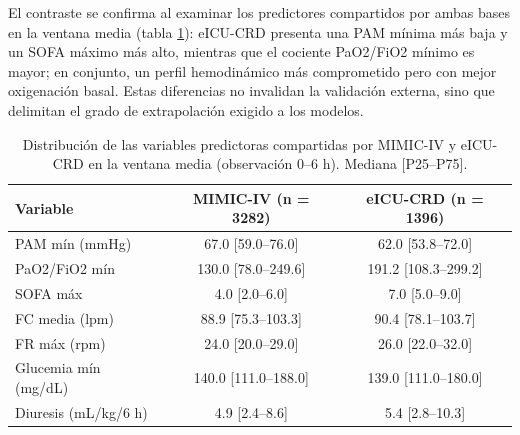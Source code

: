 \documentclass[
  spanish,
  a4paper,
  12pt,
  twoside]{memoir}
\begin{document}
\begin{table}[htbp]
\centering
\caption{Características de las cohortes de desarrollo (MIMIC-IV) y de validación externa (eICU-CRD) en las tres ventanas temporales.}
\label{tab:comparacion-cohortes}
\end{table}

El contraste se confirma al examinar los predictores compartidos por
ambas bases en la ventana media (tabla
\ref{tab:predictores-comparados}): eICU-CRD presenta una PAM mínima más
baja y un SOFA máximo más alto, mientras que el cociente PaO2/FiO2
mínimo es mayor; en conjunto, un perfil hemodinámico más comprometido
pero con mejor oxigenación basal. Estas diferencias no invalidan la
validación externa, sino que delimitan el grado de extrapolación exigido
a los modelos.

\begin{table}[htbp]
\centering
\caption{Distribución de las variables predictoras compartidas por MIMIC-IV y eICU-CRD en la ventana media (observación 0--6 h). Mediana [P25--P75].}
\label{tab:predictores-comparados}

\begin{tabular}{lcc}
\toprule
Variable & MIMIC-IV (n = 3282) & eICU-CRD (n = 1396)\\
\midrule
PAM mín (mmHg) & 67.0 [59.0–76.0] & 62.0 [53.8–72.0]\\
PaO2/FiO2 mín & 130.0 [78.0–249.6] & 191.2 [108.3–299.2]\\
SOFA máx & 4.0 [2.0–6.0] & 7.0 [5.0–9.0]\\
FC media (lpm) & 88.9 [75.3–103.3] & 90.4 [78.1–103.7]\\
FR máx (rpm) & 24.0 [20.0–29.0] & 26.0 [22.0–32.0]\\
\addlinespace
Glucemia mín (mg/dL) & 140.0 [111.0–188.0] & 139.0 [111.0–180.0]\\
Diuresis (mL/kg/6 h) & 4.9 [2.4–8.6] & 5.4 [2.8–10.3]\\
\bottomrule
\end{tabular}
\end{table}
\end{document}

